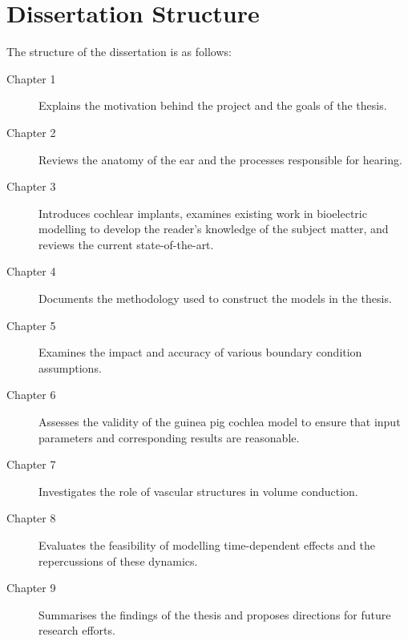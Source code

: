 



\section{Dissertation Structure}

The structure of the dissertation is as follows:

\begin{description}
	\item[\textsf{Chapter 1}] Explains the motivation behind the project and the
	goals of the thesis.
	\item[\textsf{Chapter 2}] Reviews the anatomy of the ear and the processes
	responsible for hearing.
	\item[\textsf{Chapter 3}] Introduces cochlear implants, examines existing work
	in bioelectric modelling to develop the reader's knowledge of the subject
	matter, and reviews the current state-of-the-art.
	\item[\textsf{Chapter 4}] Documents the methodology used to construct the
	models in the thesis.
	\item[\textsf{Chapter 5}] Examines the impact and accuracy of various
	boundary condition assumptions.
	\item[\textsf{Chapter 6}] Assesses the validity of the guinea pig cochlea model
	to ensure that input parameters and corresponding results are reasonable.
	\item[\textsf{Chapter 7}] Investigates the role of vascular	structures in
	volume conduction.
	\item[\textsf{Chapter 8}] Evaluates the feasibility of modelling
	time-dependent effects and the repercussions of these dynamics.
	\item[\textsf{Chapter 9}] Summarises the findings of the thesis and proposes
	directions for future research efforts.
\end{description}
